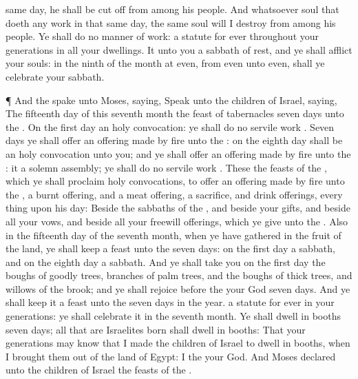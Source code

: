 {same
day, he shall be cut
off from among his
people.
And whatsoever
soul
{} that
doeth any
work in that
same
day, the same
soul will I
destroy from
among his
people.
Ye shall
do no manner of
work:
{} a
statute for
ever throughout your
generations in all your
dwellings.
It
{} unto you a
sabbath of
rest, and ye shall
afflict your
souls: in the
ninth
{} of the
month at
even, from
even unto
even, shall ye
celebrate your
sabbath.
\par }{\PP {}¶ And the
{}
spake unto
Moses,
saying,
Speak unto the
children of
Israel,
saying, The
fifteenth
day of this
seventh
month
{} the
feast of
tabernacles
{}
seven
days unto the
{}.
On the
first
day
{} an
holy
convocation: ye shall
do no
servile
work
{}.
Seven
days ye shall
offer an offering made by
fire unto the
{}: on the
eighth
day shall be an
holy
convocation unto you; and ye shall
offer an offering made by
fire unto the
{}: it
{} a solemn
assembly;
{} ye shall
do no
servile
work
{}.
These
{} the
feasts of the
{}, which ye shall
proclaim
{}
holy
convocations, to
offer an offering made by
fire unto the
{}, a burnt
offering, and a meat
offering, a
sacrifice, and drink
offerings, every
thing upon
his
day:
Beside the
sabbaths of the
{}, and beside your
gifts, and beside all your
vows, and beside all your freewill
offerings, which ye
give unto the
{}.
Also in the
fifteenth
day of the
seventh
month, when ye have
gathered in the
fruit of the
land, ye shall
keep a
feast unto the
{}
seven
days: on the
first
day
{} a
sabbath, and on the
eighth
day
{} a
sabbath.
And ye shall
take you on the
first
day the
boughs of
goodly
trees,
branches of
palm trees, and the
boughs of
thick
trees, and
willows of the
brook; and ye shall
rejoice
before the
{} your
God
seven
days.
And ye shall
keep it a
feast unto the
{}
seven
days in the
year.
{} a
statute for
ever in your
generations: ye shall
celebrate it in the
seventh
month.
Ye shall
dwell in
booths
seven
days; all that are
Israelites
born shall
dwell in
booths:
That your
generations may
know that I made the
children of
Israel to
dwell in
booths, when I brought them
out of the
land of
Egypt: I
{} the
{} your
God.
And
Moses
declared unto the
children of
Israel the
feasts of the
{}.

}
